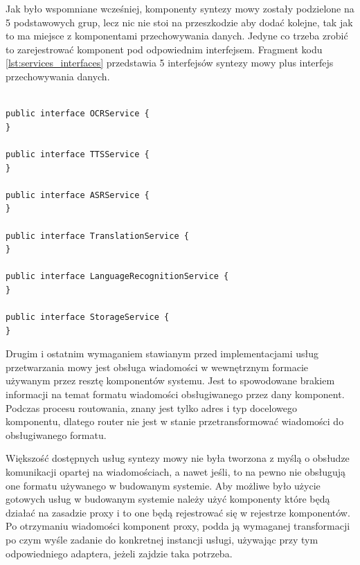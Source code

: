Jak było wspomniane wcześniej, komponenty syntezy mowy zostały podzielone na 5 podstawowych grup, lecz nic nie stoi na przeszkodzie aby dodać kolejne, tak jak to ma miejsce z komponentami przechowywania danych. Jedyne co trzeba zrobić to zarejestrować komponent pod odpowiednim interfejsem. Fragment kodu \ref{lst:services_interfaces} przedstawia 5 interfejsów syntezy mowy plus interfejs przechowywania danych.

\lstset{language=Java, tabsize=4, caption=Definicja interfejsów komponentów dostarczających usługi przetwarzania mowy i przechowywania danych w języku Java.,label=lst:services_interfaces}

\begin{center}
\begin{lstlisting}

public interface OCRService {
}

public interface TTSService {
}

public interface ASRService {
}

public interface TranslationService {
}

public interface LanguageRecognitionService {
}

public interface StorageService {
}
\end{lstlisting}
\end{center}

Drugim i ostatnim wymaganiem stawianym przed implementacjami usług przetwarzania mowy jest obsługa wiadomości w wewnętrznym formacie używanym przez resztę komponentów systemu. Jest to spowodowane brakiem informacji na temat formatu wiadomości obsługiwanego przez dany komponent. Podczas procesu routowania, znany jest tylko adres i typ docelowego komponentu, dlatego router nie jest w stanie przetransformować wiadomości do obsługiwanego formatu. 


Większość dostępnych usług syntezy mowy nie była tworzona z myślą o obsłudze komunikacji opartej na wiadomościach, a nawet jeśli, to na pewno nie obsługują one formatu używanego w budowanym systemie. Aby możliwe było użycie gotowych usług w budowanym systemie należy użyć komponenty które będą działać na zasadzie proxy i to one będą rejestrować się w rejestrze komponentów. Po otrzymaniu wiadomości komponent proxy, podda ją wymaganej transformacji po czym wyśle zadanie do konkretnej instancji usługi, używając przy tym odpowiedniego adaptera, jeżeli zajdzie taka potrzeba. 

